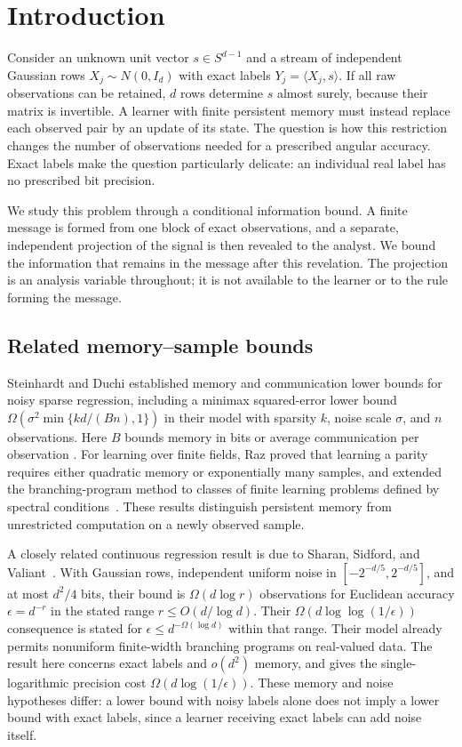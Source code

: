 \section{Introduction}\label{sec:introduction}

Consider an unknown unit vector $s\in S^{d-1}$ and a stream of independent
Gaussian rows $X_j\sim N(0,I_d)$ with exact labels
$Y_j=\langle X_j,s\rangle$. If all raw observations can be retained, $d$
rows determine $s$ almost surely, because their matrix is invertible.
A learner with finite persistent memory must instead replace each observed
pair by an update of its state. The question is how this restriction changes
the number of observations needed for a prescribed angular accuracy.
Exact labels make the question particularly delicate: an individual real
label has no prescribed bit precision.

We study this problem through a conditional information bound. A finite
message is formed from one block of exact observations, and a separate,
independent projection of the signal is then revealed to the analyst.
We bound the information that remains in the message after this revelation.
The projection is an analysis variable throughout; it is not available to
the learner or to the rule forming the message.

\subsection*{Related memory--sample bounds}

Steinhardt and Duchi established memory and communication lower bounds for
noisy sparse regression, including a minimax squared-error lower bound
$\Omega(\sigma^2\min\{kd/(Bn),1\})$ in their model with sparsity $k$,
noise scale $\sigma$, and $n$ observations. Here $B$ bounds memory in bits
or average communication per observation
\cite[Theorem~2]{SteinhardtDuchi2015}.
For learning over finite fields, Raz proved that learning a parity requires
either quadratic memory or exponentially many samples, and extended the
branching-program method to classes of finite learning problems defined by
spectral conditions~\cite[Theorem~1]{Raz2016}\cite[Theorem~1]{Raz2017}.
These results distinguish persistent memory from unrestricted computation
on a newly observed sample.

A closely related continuous regression result is due to Sharan, Sidford,
and Valiant~\cite[Theorem~1 and Section~2]{SSV2019}. With Gaussian rows,
independent uniform noise in $[-2^{-d/5},2^{-d/5}]$, and at most $d^2/4$
bits, their bound is $\Omega(d\log r)$ observations for Euclidean accuracy
$\epsilon=d^{-r}$ in the stated range $r\le O(d/\log d)$. Their
$\Omega(d\log\log(1/\epsilon))$ consequence is stated for
$\epsilon\le d^{-\Omega(\log d)}$ within that range.
Their model already permits nonuniform finite-width
branching programs on real-valued data. The result here concerns exact
labels and $o(d^2)$ memory, and gives the single-logarithmic precision cost
$\Omega(d\log(1/\epsilon))$. These memory and noise hypotheses differ:
a lower bound with noisy labels alone does not imply a lower bound with
exact labels, since a learner receiving exact labels can add noise itself.

